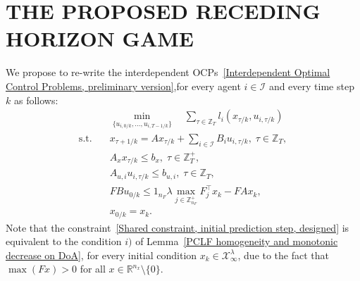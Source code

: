\documentclass[letterpaper, 10 pt, conference]{ieeeconf}  %
\begin{document}
\section{THE PROPOSED RECEDING HORIZON GAME}
We propose to re-write the interdependent OCPs~\eqref{Interdependent Optimal Control Problems, preliminary version},for every agent $i \in \mathcal{I}$ and every time step $k$ as follows:
\begin{subequations}\label{Interdependent Optimal Control Problems, designed}
\begin{align}
& \min_{\{u_{i,0/k},...,u_{i,T-1/k}\}}  \quad \sum_{\tau \in \mathbb{Z}_{T}}l_{i}(x_{\tau/k}, u_{i,\tau/k})\\
\text{s.t.} \quad & x_{\tau+1/k} = A x_{\tau/k} + \sum_{i \in \mathcal{I}}B_{i}u_{i,\tau/k},\; \tau \in \mathbb{Z}_{T}, \label{DT-LTI, IOCP, designed}\\
& A_{x} x_{\tau/k} \leq b_{x},\; \tau \in \mathbb{Z}^{+}_{T},\\
& A_{u,i} u_{i,\tau/k} \leq b_{u,i},\; \tau \in \mathbb{Z}_{T},\\
& F B u_{0/k} \leq 1_{n_{F}} \lambda \max_{j \in \mathbb{Z}^{+}_{n_{F}}} F^{\top}_{j}x_{k} - F A x_{k}, \label{Shared constraint, initial prediction step, designed}\\
& x_{0/k} = x_{k}.
\end{align}
\end{subequations}
Note that the constraint~\eqref{Shared constraint, initial prediction step, designed} is equivalent to the condition $i)$ of Lemma~\ref{PCLF homogeneity and monotonic decrease on DoA}, for every initial condition $x_{k} \in \mathcal{X}^{\lambda}_{\infty}$, due to the fact that $\max(Fx) > 0$ for all $x \in \mathbb{R}^{n_x} \setminus \{0\}$.
\end{document}
